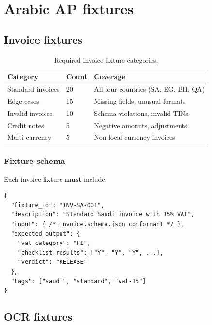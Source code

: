 \section{Arabic AP fixtures}

\subsection{Invoice fixtures}

\begin{table}[htbp]
\centering
\caption{Required invoice fixture categories.}
\label{tab:invoice-fixtures}
\footnotesize
\begin{tabularx}{\linewidth}{@{}l l X@{}}
\toprule
\textbf{Category} & \textbf{Count} & \textbf{Coverage} \\ \midrule
Standard invoices & 20 & All four countries (SA, EG, BH, QA) \\
Edge cases & 15 & Missing fields, unusual formats \\
Invalid invoices & 10 & Schema violations, invalid TINs \\
Credit notes & 5 & Negative amounts, adjustments \\
Multi-currency & 5 & Non-local currency invoices \\
\bottomrule
\end{tabularx}
\end{table}

\subsubsection{Fixture schema}

Each invoice fixture \textbf{must} include:
\begin{lstlisting}[basicstyle=\ttfamily\small]
{
  "fixture_id": "INV-SA-001",
  "description": "Standard Saudi invoice with 15% VAT",
  "input": { /* invoice.schema.json conformant */ },
  "expected_output": {
    "vat_category": "FI",
    "checklist_results": ["Y", "Y", "Y", ...],
    "verdict": "RELEASE"
  },
  "tags": ["saudi", "standard", "vat-15"]
}
\end{lstlisting}

\subsection{OCR fixtures}

